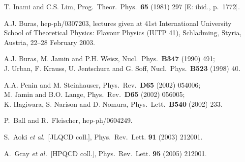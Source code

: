 \documentclass[12pt]{article}
\begin{document}
\begin{thebibliography}{999}
T. Inami and C.S. Lim,
{ Prog.\ Theor.\ Phys.}~{\bf 65} (1981) 297
[E: ibid., p.\ 1772].

A.J. Buras, hep-ph/0307203,
lectures given at 41st International University School of Theoretical 
Physics: Flavour Physics (IUTP 41), Schladming, Styria, 
Austria, 22--28 February 2003.

A.J. Buras, M. Jamin and P.H. Weisz,
{ Nucl.\ Phys.}~{\bf B347} (1990) 491;\\
J. Urban, F. Krauss, U. Jentschura and G. Soff,
{ Nucl.\ Phys.}~{\bf B523} (1998) 40.

A.A. Penin and M. Steinhauser,
{ Phys.\ Rev.}~{\bf D65} (2002) 054006;\\
M. Jamin and B.O. Lange,
{ Phys.\ Rev.}~{\bf D65} (2002) 056005;\\
K. Hagiwara, S. Narison and D. Nomura,
{ Phys.\ Lett.}~{\bf B540} (2002) 233.

P.~Ball and R.~Fleischer,
  hep-ph/0604249.

S.~Aoki {\it et al.}\  [JLQCD coll.],
{ Phys.\ Rev.\ Lett.} {\bf 91} (2003) 212001.

A.~Gray {\it et al.}\  [HPQCD coll.],
{  Phys.\ Rev.\ Lett.} {\bf 95} (2005) 212001.


\end{thebibliography}
\end{document}
